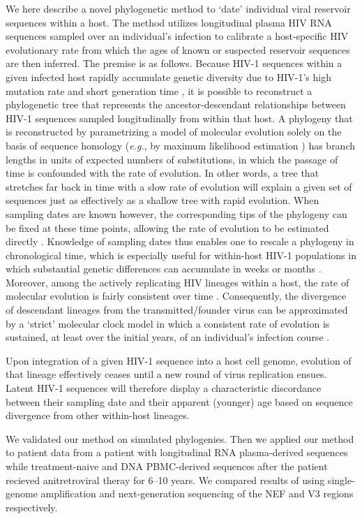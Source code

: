 \documentclass[9pt,twocolumn,twoside,lineno]{pnas-new}
\begin{document}
We here describe a novel phylogenetic method to `date' individual viral reservoir sequences within a host.
The method utilizes longitudinal plasma HIV RNA sequences sampled over an individual's infection to calibrate a host-specific HIV evolutionary rate from which the ages of known or suspected reservoir sequences are then inferred. The premise is as follows.
Because HIV-1 sequences within a given infected host rapidly accumulate genetic diversity due to HIV-1's high mutation rate and short generation time \cite{Alizon13,Rambaut04,Shankarappa99}, it is possible to reconstruct a phylogenetic tree that represents the ancestor-descendant relationships between HIV-1 sequences sampled longitudinally from within that host.
A phylogeny that is reconstructed by parametrizing a model of molecular evolution solely on the basis of sequence homology (\emph{e.g.}, by maximum likelihood estimation \cite{Felsenstein81}) has branch lengths in units of expected numbers of substitutions, in which the passage of time is confounded with the rate of evolution.
In other words, a tree that stretches far back in time with a slow rate of evolution will explain a given set of sequences just as effectively as a shallow tree with rapid evolution.
When sampling dates are known however, the corresponding tips of the phylogeny can be fixed at these time points, allowing the rate of evolution to be estimated directly \cite{Rodrigo99}.
Knowledge of sampling dates thus enables one to rescale a phylogeny in chronological time, which is especially useful for within-host HIV-1 populations in which substantial genetic differences can accumulate in weeks or months \cite{Williamson03}.
Moreover, among the actively replicating HIV lineages within a host, the rate of molecular evolution is fairly consistent over time \cite{Korber00,Kuhner95,Leitner99,Park16}.
Consequently, the divergence of descendant lineages from the transmitted/founder virus can be approximated by a `strict' molecular clock model in which a consistent rate of evolution is sustained, at least over the initial years, of an individual's infection course \cite{Keele08}. 

Upon integration of a given HIV-1 sequence into a host cell genome, evolution of that lineage effectively ceases until a new round of virus replication ensues.
Latent HIV-1 sequences will therefore display a characteristic discordance between their sampling date and their apparent (younger) age based on sequence divergence from other within-host lineages.

We validated our method on simulated phylogenies.
Then we applied our method to patient data from a patient with longitudinal RNA plasma-derived sequences while treatment-naive and DNA PBMC-derived sequences after the patient recieved anitretroviral theray for 6--10 years.
We compared results of using single-genome amplification and next-generation sequencing of the NEF and V3 regions respectively.
\end{document}
